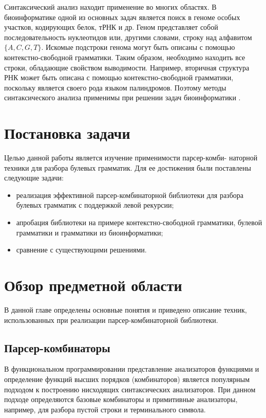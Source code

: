 \documentclass[14pt]{matmex-diploma}
\begin{document}
Синтаксический анализ находит применение во многих областях. В биоинформатике одной из основных задач является поиск в геноме особых участков, кодирующих белок, тРНК и др. Геном представляет собой последовательность нуклеотидов или, другими словами, строку над алфавитом $\{A, C, G, T\}$. Искомые подстроки генома могут быть описаны с помощью контекстно-свободной грамматики. Таким образом, необходимо находить все строки, обладающие свойством выводимости. Например, вторичная структура РНК может быть описана с помощью контекстно-свободной грамматики, поскольку является своего рода языком палиндромов. Поэтому методы синтаксического анализа применимы при решении задач биоинформатики \cite{sippl1999biological}.

\section{Постановка задачи}

Целью данной работы является изучение применимости парсер-комби-
наторной техники для разбора булевых грамматик. Для ее достижения были поставлены следующие задачи:

\begin{itemize}
    \item реализация эффективной парсер-комбинаторной библиотеки для разбора булевых грамматик с поддержкой левой рекурсии;
    \item апробация библиотеки на примере контекстно-свободной грамматики, булевой грамматики и грамматики из биоинформатики;
    \item сравнение с существующими решениями.
\end{itemize}

\section{Обзор предметной области}
В данной главе определены основные понятия и приведено описание техник, использованных при реализации парсер-комбинаторной библиотеки.

    \subsection{Парсер-комбинаторы}
В функциональном программировании представление анализаторов функциями и определение функций высших порядков (комбинаторов) является популярным подходом к построению нисходящих синтаксических анализаторов. При данном подходе определяются базовые комбинаторы и примитивные анализаторы, например, для разбора пустой строки и терминального символа.
\end{document}
